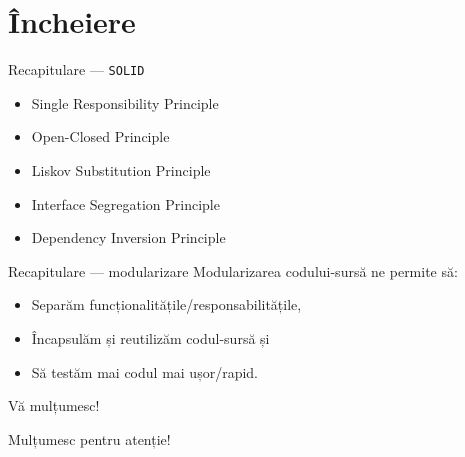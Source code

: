 \documentclass[presentation]{beamer}
\begin{document}
\section{Încheiere}
\label{sec:org39a69f9}
\begin{frame}[label={sec:orgd64be01},fragile]{Recapitulare --- \texttt{SOLID}}
 \begin{itemize}
\item \alert{Single Responsibility Principle}
\item \alert{Open-Closed Principle}
\item \alert{Liskov Substitution Principle}
\item \alert{Interface Segregation Principle}
\item \alert{Dependency Inversion Principle}
\end{itemize}
\end{frame}
\begin{frame}[label={sec:org0585e6f}]{Recapitulare --- modularizare}
Modularizarea codului-sursă ne permite să:
\begin{itemize}
\item Separăm funcționalitățile/responsabilitățile,
\item Încapsulăm și reutilizăm codul-sursă și
\item Să testăm mai codul mai ușor/rapid.
\end{itemize}
\end{frame}
\begin{frame}[label={sec:org3f6ed04}]{Vă mulțumesc!}
\begin{center}
Mulțumesc pentru atenție!
\end{center}
\end{frame}
\end{document}
